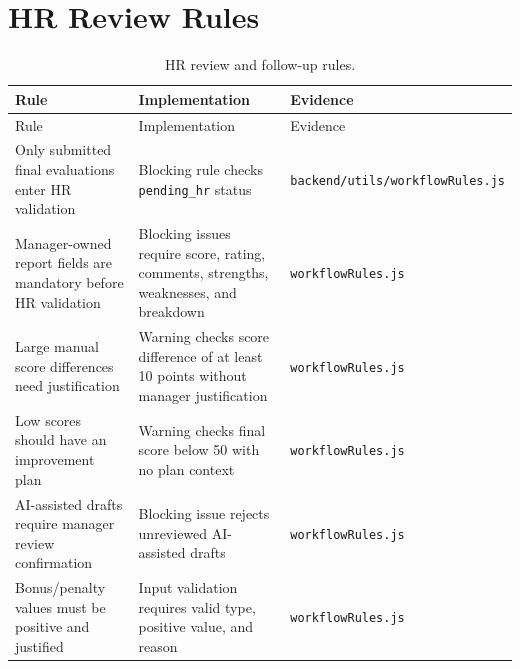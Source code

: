 \section{HR Review Rules}
\begin{longtable}{p{}p{}p{}}
\caption{HR review and follow-up rules.}\label{tab:hr-rules}\\
\toprule
Rule & Implementation & Evidence\\
\midrule
\endfirsthead
\toprule
Rule & Implementation & Evidence\\
\midrule
\endhead
Only submitted final evaluations enter HR validation & Blocking rule checks \texttt{pending\_hr} status & \texttt{backend/utils/workflowRules.js}\\
Manager-owned report fields are mandatory before HR validation & Blocking issues require score, rating, comments, strengths, weaknesses, and breakdown & \texttt{workflowRules.js}\\
Large manual score differences need justification & Warning checks score difference of at least 10 points without manager justification & \texttt{workflowRules.js}\\
Low scores should have an improvement plan & Warning checks final score below 50 with no plan context & \texttt{workflowRules.js}\\
AI-assisted drafts require manager review confirmation & Blocking issue rejects unreviewed AI-assisted drafts & \texttt{workflowRules.js}\\
Bonus/penalty values must be positive and justified & Input validation requires valid type, positive value, and reason & \texttt{workflowRules.js}\\
\bottomrule
\end{longtable}
